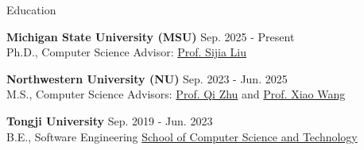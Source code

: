 \begin{rSection}{Education}
\small{{\bf Michigan State University (MSU)} \hfill Sep. 2025 - Present
\\ Ph.D., Computer Science \hfill Advisor: \href{https://lsjxjtu.github.io/index.html}{\textcolor{BS_color}{Prof. Sijia Liu}} 

\vspace{-2mm}
{\bf Northwestern University (NU)} \hfill Sep. 2023 - Jun. 2025
\\ M.S., Computer Science \hfill Advisors:  \href{https://scholar.google.com/citations?user=TN09YMcAAAAJ&hl=en}{\textcolor{BS_color}{Prof. Qi Zhu}} and \href{https://wangxiao1254.github.io/}{\textcolor{BS_color}{Prof. Xiao Wang}}

\vspace{-2mm}
{\bf Tongji University} \hfill Sep. 2019 - Jun. 2023
\\ B.E., Software Engineering \hfill \href{https://cs.tongji.edu.cn/}{\textcolor{BS_color}{School of Computer Science and Technology}}} \\
\vspace{-5.0mm}
\vspace{-2mm}

\end{rSection}
